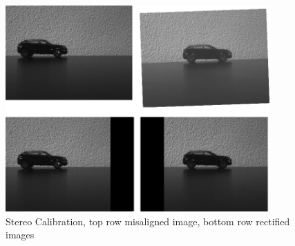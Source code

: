 \documentclass[11pt,a4paper,titlepage,oneside]{report}
\begin{document}
\begin{figure}[H]
  \begin{center}
		\includegraphics[width=0.9\textwidth]{img/stereo_calib.png}
  \end{center}
	\caption{Stereo Calibration, top row misaligned image, bottom row rectified images}\label{fig:stereo_calib}
\end{figure}
\end{document}
